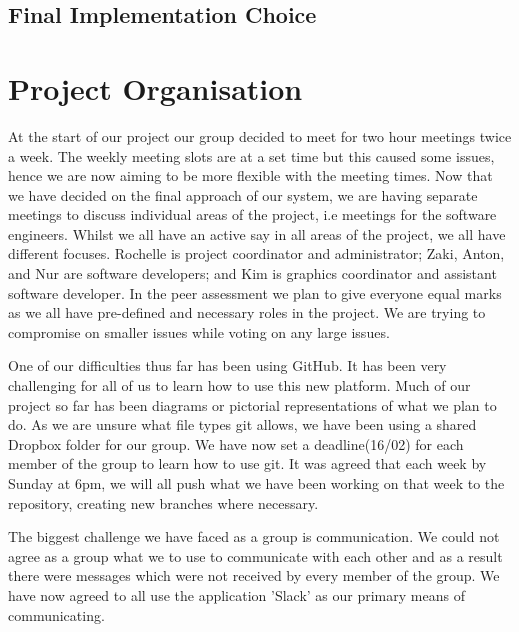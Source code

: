 \documentclass[11pt]{article}
\begin{document}

\subsection{Final Implementation Choice}

	
	
	
	\section{Project Organisation}
		At the start of our project our group decided to meet for two hour meetings twice a week. 
		The weekly meeting slots are at a set time but this caused some issues, hence we are now aiming to be more flexible with the meeting times. 
		Now that we have decided on the final approach of our system, we are having separate meetings to discuss individual areas of the project, i.e meetings for the software engineers. 
		Whilst we all have an active say in all areas of the project, we all have different focuses. 
		Rochelle is project coordinator and administrator; Zaki, Anton, and Nur are software developers; and Kim is graphics coordinator and assistant software developer. 
		In the peer assessment we plan to give everyone equal marks as we all have pre-defined and necessary roles in the project. 
		We are trying to compromise on smaller issues while voting on any large issues. 
		 
		One of our difficulties thus far has been using GitHub. 
		It has been very challenging for all of us to learn how to use this new platform. 
		Much of our project so far has been diagrams or pictorial representations of what we plan to do. 
		As we are unsure what file types git allows, we have been using a shared Dropbox folder for our group. 
		We have now set a deadline(16/02) for each member of the group to learn how to use git. 
		It was agreed that each week by Sunday at 6pm, we will all push what we have been working on that week to the repository, creating new branches where necessary. 
		
		The biggest challenge we have faced as a group is communication. 
		We could not agree as a group what we to use to communicate with each other and as a result there were messages which were not received by every member of the group. 
		We have now agreed to all use the application 'Slack' as our primary means of communicating. 
		
\end{document}
